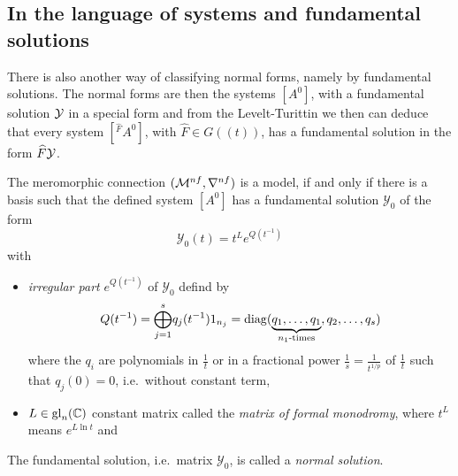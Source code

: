 \subsection{In the language of systems and fundamental solutions}
There is also another way of classifying normal forms, namely by fundamental
solutions. The normal forms are then the systems $[A^0]$, with a fundamental
solution $\mathcal{Y}$ in a special form and from the Levelt-Turittin we then can
deduce that every system $[{}^{\hat F}\!A^0]$, with $\hat F\in G(\!(t)\!)$, has
a fundamental solution in the form $\widehat F\mathcal{Y}$.
\begin{lem} \label{lem:normSol}

  The meromorphic connection $(\mathcal{M}^{nf},\nabla^{nf})$ is a model, if and
  only if there is a basis such that the defined system $[A^0]$ has a
  fundamental solution $\mathcal{Y}_0$ of the form
  \[
    \mathcal{Y}_0(t)=t^L e^{Q(t^{-1})}
  \]
  with
  \begin{itemize}
    \item \emph{irregular part} $e^{Q(t^{-1})}$ of $\mathcal{Y}_0$ defind by
      \[
        Q(t^{-1})=\underset{j=1}{\overset{s}{\bigoplus}}q_j(t^{-1})1_{n_j}
          =\diag(\underset{n_1\text{-times}}{\underbrace{%
          q_1,\dots,q_1}},q_2,\dots,q_s)
      \]
      where the $q_i$ are polynomials in $\frac{1}{t}$ or in a fractional power
      $\frac{1}{s}=\frac{1}{t^{1/p}}$ of $\frac{1}{t}$ such that $q_j(0)=0$,
      i.e.\ without constant term,
    \item $L\in\operatorname{gl}_n(\mathbb{C})$ constant matrix called the \emph{matrix of formal
      monodromy}, where $t^L$ means $e^{L\ln t}$ and
  \end{itemize}
  \begin{comment}
    The models $(\cM^{nf},\nabla^{nf})$ only yield the unramified case!
  \end{comment}
  The fundamental solution, i.e.\ matrix $\mathcal{Y}_0$, is called a
  \emph{normal solution}.
  \begin{comment}
    \begin{s-cor}
      A system $[A]$ is a model, if it has, up to meromorphic base change, a
      fundamental solution of the form $t^L e^{Q(t^{-1})}$, i.e.\ it has a
      fundamental solution of the form $Ft^L e^{Q(t^{-1})}$ with
      $F\in G(\!\{t\}\!)$.
    \end{s-cor}
  \end{comment}
\end{lem}
